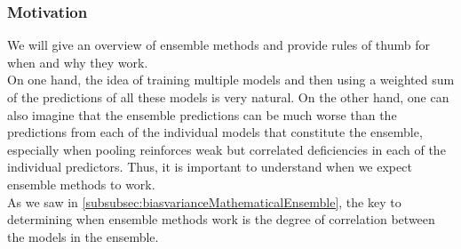 \subsubsection{Motivation}
\label{subsubsec:ensemblesMotivation}
We will give an overview of ensemble methods and provide rules of thumb for when and why they work.\\
On one hand, the idea of training multiple models and then using a weighted sum of the predictions of all these models is very natural. On the other hand, one can also imagine that the ensemble predictions can be much worse than the predictions from each of the individual models that constitute the ensemble, especially when pooling reinforces weak but correlated deficiencies in each of the individual predictors. Thus, it is important to understand when we expect ensemble methods to work.\\
As we saw in \ref{subsubsec:biasvarianceMathematicalEnsemble}, the key to determining when ensemble methods work is the degree of correlation between the models in the ensemble.
